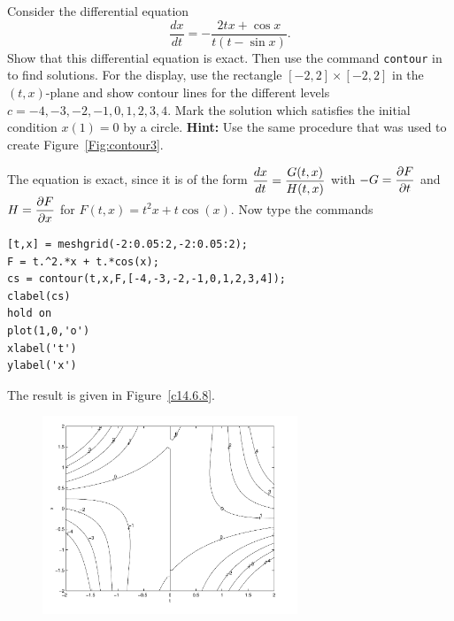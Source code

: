 \documentclass{ximera}
\begin{document}
\begin{computerExercise} \label{c14.6.8}
Consider the differential equation
\[
\frac{dx}{dt} = -\frac{2tx+\cos x}{t(t-\sin x)}.
\]
Show that this differential equation is 
exact.  Then use the command {\tt contour} in \Matlab 
to find solutions.  For the display, 
use the rectangle $[-2,2]\times [-2,2]$ in the $(t,x)$-plane and show contour
lines for the different levels $c=-4,-3,-2,-1,0,1,2,3,4$.  Mark the solution
which satisfies the initial condition $x(1)=0$ by a circle.
{\bf Hint:} Use the same procedure that was used to create 
Figure~\ref{Fig:contour3}.

\begin{solution}
The equation is exact, since it is of the form
$\displaystyle\frac{dx}{dt} = \frac{G(t,x)}{H(t,x)}$ with
$-G=\displaystyle\frac{\partial F}{\partial t}$ and
$H=\displaystyle\frac{\partial F}{\partial x}$ for $F(t,x) = t^2 x + t\cos(x)$.
Now type the commands
\begin{verbatim}
[t,x] = meshgrid(-2:0.05:2,-2:0.05:2);
F = t.^2.*x + t.*cos(x);
cs = contour(t,x,F,[-4,-3,-2,-1,0,1,2,3,4]);
clabel(cs)
hold on
plot(1,0,'o')
xlabel('t')
ylabel('x')
\end{verbatim}
The result is given in Figure~\ref{c14.6.8}.
\begin{figure}[htb]
     \centerline{%
     \includegraphics[width=3.0in]{exfigure/fig17-6-9.pdf}}
\end{figure} 




\end{solution}
\end{computerExercise}
\end{document}
